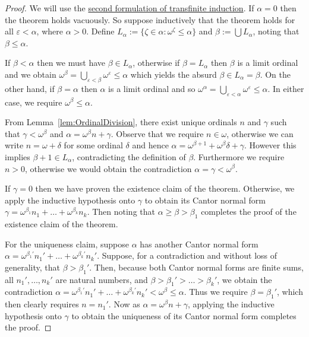 \documentclass[a4paper,11pt]{article}
\theoremstyle{plain}
\theoremstyle{definition}
\theoremstyle{remark}
\begin{document}
\begin{proof}
We will use the \hyperref[thm:Tinduction2]{second formulation of transfinite induction}. If $\alpha = 0$ then the theorem holds vacuously. So suppose inductively that the theorem holds for all $\varepsilon < \alpha$, where $\alpha > 0$. Define $L_\alpha := \{\zeta\in\alpha : \omega^\zeta \leq \alpha\}$ and $\beta := \bigcup L_\alpha$, noting that $\beta \leq \alpha$.

If $\beta<\alpha$ then we must have $\beta \in L_\alpha$, otherwise if $\beta = L_\alpha$ then $\beta$ is a limit ordinal and we obtain $\omega^\beta = \bigcup_{\varepsilon<\beta}\omega^\varepsilon \leq \alpha$ which yields the absurd $\beta \in L_\alpha = \beta$. On the other hand, if $\beta = \alpha$ then $\alpha$ is a limit ordinal and so $\omega^\alpha = \bigcup_{\varepsilon < \alpha}\omega^\varepsilon \leq \alpha$. In either case, we require $\omega^\beta \leq \alpha$.

From Lemma~\ref{lem:OrdinalDivision}, there exist unique ordinals $n$ and $\gamma$ such that $\gamma < \omega^\beta$ and $\alpha = \omega^\beta n + \gamma$. Observe that we require $n\in\omega$, otherwise we can write $n = \omega + \delta$ for some ordinal $\delta$ and hence $\alpha = \omega^{\beta + 1} + \omega^\beta \delta + \gamma$. However this implies $\beta+1 \in L_\alpha$, contradicting the definition of $\beta$. Furthermore we require $n > 0$, otherwise we would obtain the contradiction $\alpha = \gamma < \omega^\beta$.

If $\gamma = 0$ then we have proven the existence claim of the theorem. Otherwise, we apply the inductive hypothesis onto $\gamma$ to obtain its Cantor normal form $\gamma = \omega^{\beta_1}n_1 + \dots + \omega^{\beta_k}n_k$. Then noting that $\alpha \geq \beta > \beta_1$ completes the proof of the existence claim of the theorem.

For the uniqueness claim, suppose $\alpha$ has another Cantor normal form $\alpha = \omega^{\beta_1'}n_1' + \dots + \omega^{\beta_k'}n_k'$. Suppose, for a contradiction and without loss of generality, that $\beta > \beta_1'$. Then, because both Cantor normal forms are finite sums, all $n_1',\dots,n_k'$ are natural numbers, and $\beta > \beta_1'>\dots>\beta_k'$, we obtain the contradiction $\alpha = \omega^{\beta_1'}n_1' + \dots + \omega^{\beta_k'}n_k' < \omega^\beta \leq \alpha$. Thus we require $\beta = \beta_1'$, which then clearly requires $n = n_1'$. Now as $\alpha = \omega^\beta n + \gamma$, applying the inductive hypothesis onto $\gamma$ to obtain the uniqueness of its Cantor normal form completes the proof.
\end{proof}
\end{document}
